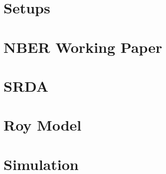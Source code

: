 \documentclass[12pt]{article}
\begin{document}
 
\section{Setups}






\section{NBER Working Paper}


\section{SRDA}


\section{Roy Model}


\section{Simulation}

\end{document}
